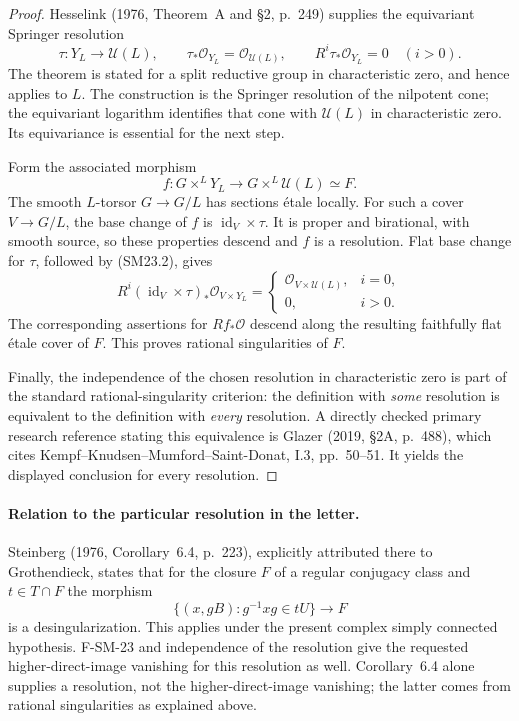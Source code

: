 \begin{proof}
Hesselink (1976, Theorem~A and \S2, p.~249) supplies the
equivariant Springer resolution
\[
 \tau:Y_L\longrightarrow\mathcal U(L),\qquad
 \tau_*\mathcal O_{Y_L}=\mathcal O_{\mathcal U(L)},\qquad
 R^i\tau_*\mathcal O_{Y_L}=0\quad(i>0).
 \tag{SM23.2}
\]
The theorem is stated for a split reductive group in
characteristic zero, and hence applies to $L$.
The construction is the Springer resolution of the nilpotent
cone; the equivariant logarithm identifies that cone with
$\mathcal U(L)$ in characteristic zero.  Its equivariance is
essential for the next step.

Form the associated morphism
\[
 f:G\times^L Y_L\longrightarrow G\times^L\mathcal U(L)\simeq F.
\]
The smooth $L$-torsor $G\to G/L$ has sections \'etale locally.
For such a cover $V\to G/L$, the base change of $f$ is
$\operatorname{id}_V\times\tau$.
It is proper and birational, with smooth source, so these
properties descend and $f$ is a resolution.
Flat base change for $\tau$, followed by (SM23.2), gives
\[
 R^i(\operatorname{id}_V\times\tau)_*
       \mathcal O_{V\times Y_L}
 =
 \begin{cases}
 \mathcal O_{V\times\mathcal U(L)},&i=0,\\
 0,&i>0.
 \end{cases}
\]
The corresponding assertions for $Rf_*\mathcal O$ descend along
the resulting faithfully flat \'etale cover of $F$.
This proves rational singularities of $F$.

Finally, the independence of the chosen resolution in
characteristic zero is part of the standard rational-singularity
criterion: the definition with \emph{some} resolution is equivalent
to the definition with \emph{every} resolution.  A directly checked
primary research reference stating this equivalence is
Glazer (2019, \S2A, p.~488), which cites
Kempf--Knudsen--Mumford--Saint-Donat, I.3, pp.~50--51.
It yields the displayed conclusion for every resolution.
\end{proof}

\paragraph{Relation to the particular resolution in the letter.}
Steinberg (1976, Corollary~6.4, p.~223), explicitly attributed
there to Grothendieck, states that for the closure $F$ of a regular
conjugacy class and $t\in T\cap F$ the morphism
\[
 \{(x,gB):g^{-1}xg\in tU\}\longrightarrow F
\]
is a desingularization.  This applies under the present complex
simply connected hypothesis.  F-SM-23 and independence of the
resolution give the requested higher-direct-image vanishing for
this resolution as well.  Corollary~6.4 alone supplies a
resolution, not the higher-direct-image vanishing; the latter
comes from rational singularities as explained above.

